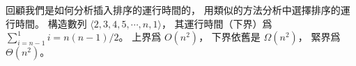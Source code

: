\startEXERCISE
回顧我們是如何分析插入排序的運行時間的，
用類似的方法分析中選擇排序的運行時間。
\stopEXERCISE
\startANSWER
構造數列 $\langle 2,3,4,5,\cdots,n,1\rangle$，
其運行時間（下界）爲 $\sum_{i=n-1}^{1}i = n(n-1)/2$。
上界爲 $O(n^2)$，
下界依舊是 $\Omega(n^2)$，
緊界爲 $\Theta(n^2)$。
\stopANSWER
